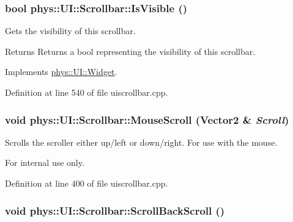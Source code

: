 \hypertarget{classphys_1_1UI_1_1Scrollbar_a213c946ccadd3b689f59e2761a1d1848}{
\subsubsection[{IsVisible}]{\setlength{\rightskip}{0pt plus 5cm}bool phys::UI::Scrollbar::IsVisible ()}}
\label{d0/d3e/classphys_1_1UI_1_1Scrollbar_a213c946ccadd3b689f59e2761a1d1848}


Gets the visibility of this scrollbar. 

\begin{DoxyReturn}{Returns}
Returns a bool representing the visibility of this scrollbar. 
\end{DoxyReturn}


Implements \hyperlink{classphys_1_1UI_1_1Widget_aaf1a1bd31b8e626467ce9cdb69bdf7ac}{phys::UI::Widget}.



Definition at line 540 of file uiscrollbar.cpp.

\hypertarget{classphys_1_1UI_1_1Scrollbar_ac50a2cd5b85c8b2ff0cabf22b898a0fa}{
\subsubsection[{MouseScroll}]{\setlength{\rightskip}{0pt plus 5cm}void phys::UI::Scrollbar::MouseScroll ({\bf Vector2} \& {\em Scroll})}}
\label{d0/d3e/classphys_1_1UI_1_1Scrollbar_ac50a2cd5b85c8b2ff0cabf22b898a0fa}


Scrolls the scroller either up/left or down/right. For use with the mouse. 

\begin{DoxyInternal}{For internal use only.}
\end{DoxyInternal}


Definition at line 400 of file uiscrollbar.cpp.

\hypertarget{classphys_1_1UI_1_1Scrollbar_a1c6ca6b135d09d284b31fda2230c9286}{
\subsubsection[{ScrollBackScroll}]{\setlength{\rightskip}{0pt plus 5cm}void phys::UI::Scrollbar::ScrollBackScroll ()}}
\label{d0/d3e/classphys_1_1UI_1_1Scrollbar_a1c6ca6b135d09d284b31fda2230c9286}


